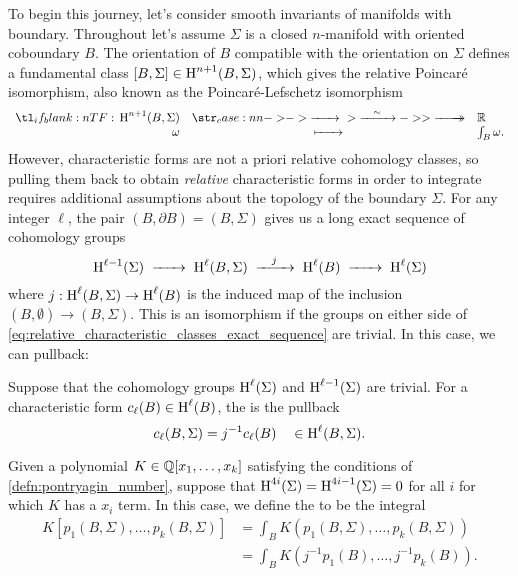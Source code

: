 To begin this journey, let's consider smooth invariants of manifolds with boundary.
Throughout let's assume $\Sigma$ is a closed $n$-manifold with oriented coboundary $B$. 
The orientation of $B$ compatible with the orientation on $\Sigma$ defines a fundamental class $[B, \Sigma]\in \operatorname{H}^{n+1}(B, \Sigma)$, which gives the relative Poincar\'e isomorphism, also known as the Poincar\'e-Lefschetz isomorphism
\[
  \lkxfunc{}{\H^{n+1}(B, \Sigma)}{\R}{\omega}{\int_{B} \omega.}
\]
However, characteristic forms are not a priori relative cohomology classes, so pulling them back to obtain \emph{relative} characteristic forms in order to integrate requires additional assumptions about the topology of the boundary $\Sigma$.
For any integer $\ell$, the pair $(B, \partial B) = (B, \Sigma)$ gives us a long exact sequence of cohomology groups
\begin{equation}\label{eq:relative_characteristic_classes_exact_sequence}
  \H^{\ell-1}(\Sigma) \lkxto \H^{\ell}(B, \Sigma) \lkxto[j] \H^{\ell}(B) \lkxto \H^{\ell}(\Sigma)
\end{equation}
where $j : \operatorname{H}^{\ell}(B, \Sigma) \to \operatorname{H}^{\ell}(B)$ is the induced map of the inclusion $(B,\emptyset) \to (B, \Sigma)$. This is an isomorphism if the groups on either side of \cref{eq:relative_characteristic_classes_exact_sequence} are trivial. In this case, we can pullback: 

\begin{definition}\label{defn:relative_characteristic_form}
  Suppose that the cohomology groups $\operatorname{H}^{\ell}(\Sigma)$ and $\operatorname{H}^{\ell-1}(\Sigma)$ are trivial. For a characteristic form $c_\ell(B) \in \operatorname{H}^{\ell}(B)$, the  is the pullback
  \[
    c_\ell(B, \Sigma) = j^{-1} c_\ell(B) \quad\in \operatorname{H}^{\ell}(B, \Sigma).
  \]
\end{definition}

\begin{definition}\label{defn:relative_characteristic_number}
  Given a polynomial $K\in \mathbb{Q}[x_1,\ldots, x_k]$ satisfying the conditions of \cref{defn:pontryagin_number}, suppose that $\operatorname{H}^{4i}(\Sigma) = \operatorname{H}^{4i-1}(\Sigma)=0$ for all $i$ for which $K$ has a $x_i$ term.
  In this case, we define the  to be the integral 
  \[
    \begin{aligned}
      K[p_1(B, \Sigma), \ldots, p_k(B,\Sigma)] 
      &= \int_B K(p_1(B, \Sigma), \ldots, p_k(B, \Sigma))\\
      &= \int_B K(j^{-1}p_1(B), \ldots, j^{-1}p_k(B)).
    \end{aligned}
  \]
\end{definition}

